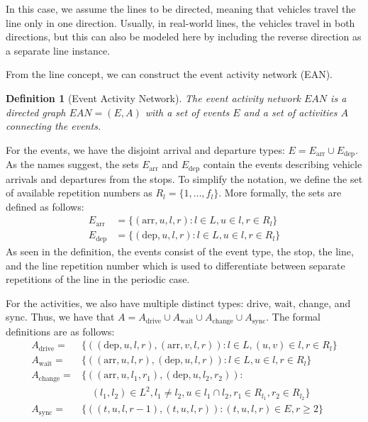 \documentclass[english, 12pt, a4paper, sci, utf8, a-2b, online]{aaltothesis}
\newtheorem{definition}{Definition}
\newcommand{\Earr}{E_\text{arr}}
\newcommand{\Edep}{E_\text{dep}}
\newcommand{\Async}{A_\text{sync}}
\begin{document}
In this case, we assume the lines to be directed, meaning that vehicles travel the line only in one direction. Usually, in real-world lines, the vehicles travel in both directions, but this can also be modeled here by including the reverse direction as a separate line instance. %

From the line concept, we can construct the event activity network (EAN).
\begin{definition}[Event Activity Network]\label{def:ean}
    The event activity network $EAN$ is a directed graph $\textit{EAN} = (E, A)$ with a set of events $E$ and a set of activities $A$ connecting the events.
\end{definition}
For the events, we have the disjoint arrival and departure types: $E = \Earr \cup \Edep$. As the names suggest, the sets $\Earr$ and $\Edep$ contain the events describing vehicle arrivals and departures from the stops. To simplify the notation, we define the set of available repetition numbers as $R_l = \{1, \dots, f_l\}$. More formally, the sets are defined as follows:
\begin{align*}
    \Earr &= \{
        (\text{arr}, u, l, r) : l \in L, u \in l, r \in R_l
    \} \\
    \Edep &= \{
        (\text{dep}, u, l, r) : l \in L, u \in l, r \in R_l
    \}
\end{align*}
As seen in the definition, the events consist of the event type, the stop, the line, and the line repetition number which is used to differentiate between separate repetitions of the line in the periodic case.

For the activities, we also have multiple distinct types: drive, wait, change, and sync. Thus, we have that $A = A_\text{drive} \cup A_\text{wait} \cup A_\text{change} \cup \Async$. The formal definitions are as follows:
\begin{align*}
    A_\text{drive} =& \{(
        (\text{dep}, u, l, r),
        (\text{arr}, v, l, r)
    ): l \in L, (u, v) \in l, r \in R_l\}\\
    A_\text{wait} =& \{(
        (\text{arr}, u, l, r),
        (\text{dep}, u, l, r)
    ): l \in L, u \in l, r \in R_l\} \\
    A_\text{change} =& \{(
        (\text{arr}, u, l_1, r_1),
        (\text{dep}, u, l_2, r_2)
    ): \\&\quad (l_1, l_2) \in L^2, l_1 \neq l_2, u \in l_1 \cap l_2, r_1 \in R_{l_1}, r_2 \in R_{l_2}\} \\
    \Async =& \{(
       (t, u, l, r-1),
       (t, u, l, r)
    ): (t, u, l, r) \in E, r \geq 2 \}
\end{align*}
\end{document}
